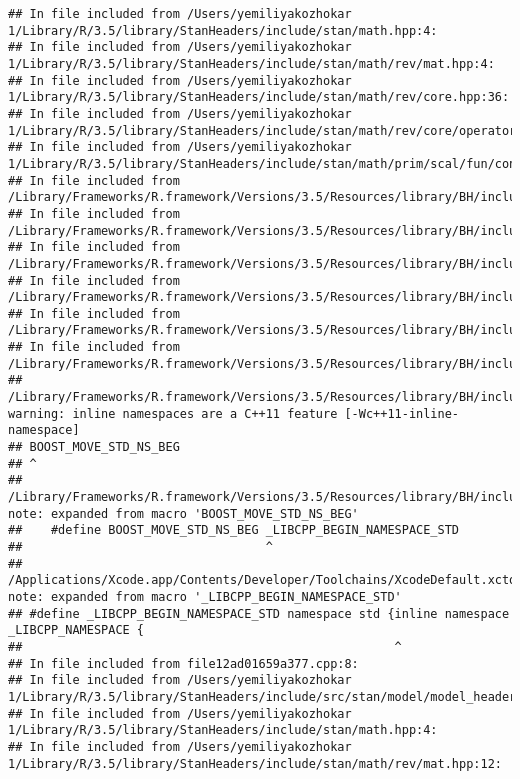 \documentclass[]{article}
\begin{document}
\begin{verbatim}
## In file included from /Users/yemiliyakozhokar 1/Library/R/3.5/library/StanHeaders/include/stan/math.hpp:4:
## In file included from /Users/yemiliyakozhokar 1/Library/R/3.5/library/StanHeaders/include/stan/math/rev/mat.hpp:4:
## In file included from /Users/yemiliyakozhokar 1/Library/R/3.5/library/StanHeaders/include/stan/math/rev/core.hpp:36:
## In file included from /Users/yemiliyakozhokar 1/Library/R/3.5/library/StanHeaders/include/stan/math/rev/core/operator_unary_plus.hpp:7:
## In file included from /Users/yemiliyakozhokar 1/Library/R/3.5/library/StanHeaders/include/stan/math/prim/scal/fun/constants.hpp:4:
## In file included from /Library/Frameworks/R.framework/Versions/3.5/Resources/library/BH/include/boost/math/constants/constants.hpp:13:
## In file included from /Library/Frameworks/R.framework/Versions/3.5/Resources/library/BH/include/boost/math/tools/convert_from_string.hpp:15:
## In file included from /Library/Frameworks/R.framework/Versions/3.5/Resources/library/BH/include/boost/lexical_cast.hpp:32:
## In file included from /Library/Frameworks/R.framework/Versions/3.5/Resources/library/BH/include/boost/lexical_cast/try_lexical_convert.hpp:42:
## In file included from /Library/Frameworks/R.framework/Versions/3.5/Resources/library/BH/include/boost/lexical_cast/detail/converter_lexical.hpp:52:
## In file included from /Library/Frameworks/R.framework/Versions/3.5/Resources/library/BH/include/boost/container/container_fwd.hpp:61:
## /Library/Frameworks/R.framework/Versions/3.5/Resources/library/BH/include/boost/container/detail/std_fwd.hpp:27:1: warning: inline namespaces are a C++11 feature [-Wc++11-inline-namespace]
## BOOST_MOVE_STD_NS_BEG
## ^
## /Library/Frameworks/R.framework/Versions/3.5/Resources/library/BH/include/boost/move/detail/std_ns_begin.hpp:18:34: note: expanded from macro 'BOOST_MOVE_STD_NS_BEG'
##    #define BOOST_MOVE_STD_NS_BEG _LIBCPP_BEGIN_NAMESPACE_STD
##                                  ^
## /Applications/Xcode.app/Contents/Developer/Toolchains/XcodeDefault.xctoolchain/usr/include/c++/v1/__config:390:52: note: expanded from macro '_LIBCPP_BEGIN_NAMESPACE_STD'
## #define _LIBCPP_BEGIN_NAMESPACE_STD namespace std {inline namespace _LIBCPP_NAMESPACE {
##                                                    ^
## In file included from file12ad01659a377.cpp:8:
## In file included from /Users/yemiliyakozhokar 1/Library/R/3.5/library/StanHeaders/include/src/stan/model/model_header.hpp:4:
## In file included from /Users/yemiliyakozhokar 1/Library/R/3.5/library/StanHeaders/include/stan/math.hpp:4:
## In file included from /Users/yemiliyakozhokar 1/Library/R/3.5/library/StanHeaders/include/stan/math/rev/mat.hpp:12:

\end{verbatim}
\end{document}
